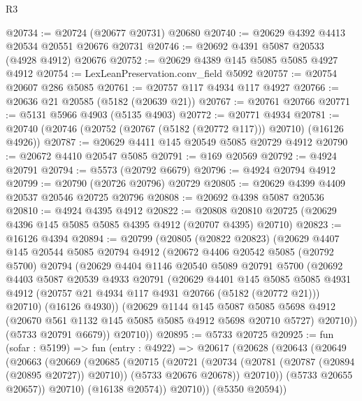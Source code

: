 \begin{lexlean}{R3}
\begin{coremodule}
@20734 := @20724 (@20677 @20731) @20680
@20740 := @20629 @4392 @4413 @20534 @20551 @20676 @20731
@20746 := @20692 @4391 @5087 @20533 (@4928 @4912) @20676
@20752 := @20629 @4389 @145 @5085 @5085 @4927 @4912
@20754 := LexLeanPreservation.conv_field @5092
@20757 := @20754 @20607 @286 @5085
@20761 := @20757 @117 @4934 @117 @4927
@20766 := @20636 @21 @20585 (@5182 (@20639 @21))
@20767 := @20761 @20766
@20771 := @5131 @5966 @4903 (@5135 @4903)
@20772 := @20771 @4934
@20781 := @20740 (@20746 (@20752 (@20767 (@5182 (@20772 @117))) @20710) (@16126 @4926))
@20787 := @20629 @4411 @145 @20549 @5085 @20729 @4912
@20790 := @20672 @4410 @20547 @5085
@20791 := @169 @20569
@20792 := @4924 @20791
@20794 := @5573 (@20792 @6679)
@20796 := @4924 @20794 @4912
@20799 := @20790 (@20726 @20796) @20729
@20805 := @20629 @4399 @4409 @20537 @20546 @20725 @20796
@20808 := @20692 @4398 @5087 @20536
@20810 := @4924 @4395 @4912
@20822 := @20808 @20810 @20725 (@20629 @4396 @145 @5085 @5085 @4395 @4912 (@20707 @4395) @20710)
@20823 := @16126 @4394
@20894 := @20799
    (@20805
      (@20822 @20823)
      (@20629
        @4407
        @145
        @20544
        @5085
        @20794
        @4912
        (@20672
          @4406
          @20542
          @5085
          (@20792 @5700)
          @20794
          (@20629
            @4404
            @1146
            @20540
            @5089
            @20791
            @5700
            (@20692
              @4403
              @5087
              @20539
              @4933
              @20791
              (@20629
                @4401
                @145
                @5085
                @5085
                @4931
                @4912
                (@20757 @21 @4934 @117 @4931 @20766 (@5182 (@20772 @21)))
                @20710)
              (@16126 @4930))
            (@20629
              @1144
              @145
              @5087
              @5085
              @5698
              @4912
              (@20670 @561 @1132 @145 @5085 @5085 @4912 @5698 @20710 @5727)
              @20710))
          (@5733 @20791 @6679))
        @20710))
@20895 := @5733 @20725
@20925 := fun (sofar : @5199) =>
  fun (entry : @4922) =>
  @20617
    (@20628
      (@20643
        (@20649
          (@20663
            (@20669
              (@20685
                (@20715
                  (@20721
                    (@20734 (@20781 (@20787 (@20894 (@20895 @20727)) @20710)) (@5733 @20676 @20678))
                    @20710))
                (@5733 @20655 @20657))
              @20710)
            (@16138 @20574))
          @20710))
      (@5350 @20594))

\end{coremodule}
\end{lexlean}
